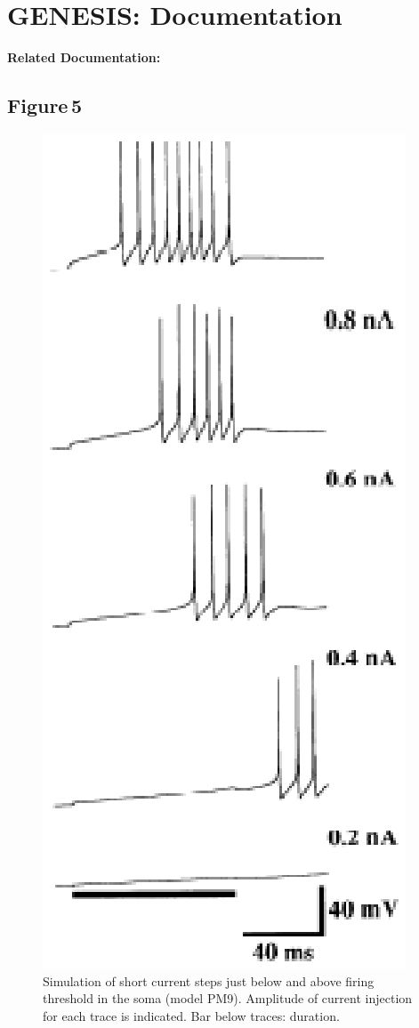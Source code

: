 \documentclass[12pt]{article}
\begin{document}
\section*{GENESIS: Documentation}

{\bf Related Documentation:}

\subsection*{Figure\,5}

\begin{figure}[h]
\centering
   \includegraphics[scale=1]{figures/Fig.1.5.eps}
   \caption{Simulation of short current steps just below and above firing threshold in the soma (model PM9). Amplitude of current injection for each trace is indicated. Bar below traces: duration.}
   \label{fig:DS1.5}
\end{figure}



\end{document}
